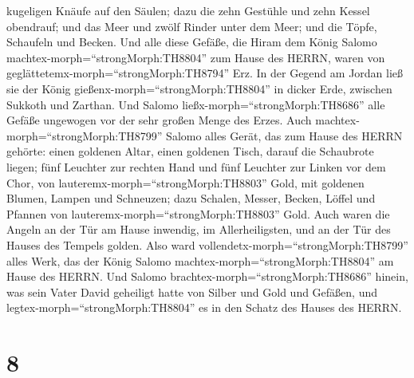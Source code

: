 kugeligen Knäufe auf den Säulen;  dazu die zehn Gestühle
und zehn Kessel obendrauf;  und das Meer und zwölf Rinder
unter dem Meer;  und die Töpfe, Schaufeln und Becken. Und
alle diese Gefäße, die Hiram dem König Salomo
machtex-morph=``strongMorph:TH8804'' zum Hause des HERRN, waren von
geglättetemx-morph=``strongMorph:TH8794'' Erz.  In der
Gegend am Jordan ließ sie der König gießenx-morph=``strongMorph:TH8804''
in dicker Erde, zwischen Sukkoth und Zarthan.  Und Salomo
ließx-morph=``strongMorph:TH8686'' alle Gefäße ungewogen vor der sehr
großen Menge des Erzes.  Auch
machtex-morph=``strongMorph:TH8799'' Salomo alles Gerät, das zum Hause
des HERRN gehörte: einen goldenen Altar, einen goldenen Tisch, darauf
die Schaubrote liegen;  fünf Leuchter zur rechten Hand und
fünf Leuchter zur Linken vor dem Chor, von
lauteremx-morph=``strongMorph:TH8803'' Gold, mit goldenen Blumen, Lampen
und Schneuzen;  dazu Schalen, Messer, Becken, Löffel und
Pfannen von lauteremx-morph=``strongMorph:TH8803'' Gold. Auch waren die
Angeln an der Tür am Hause inwendig, im Allerheiligsten, und an der Tür
des Hauses des Tempels golden.  Also ward
vollendetx-morph=``strongMorph:TH8799'' alles Werk, das der König Salomo
machtex-morph=``strongMorph:TH8804'' am Hause des HERRN. Und Salomo
brachtex-morph=``strongMorph:TH8686'' hinein, was sein Vater David
geheiligt hatte von Silber und Gold und Gefäßen, und
legtex-morph=``strongMorph:TH8804'' es in den Schatz des Hauses des
HERRN.

\hypertarget{section-7}{%
\section{8}\label{section-7}}

